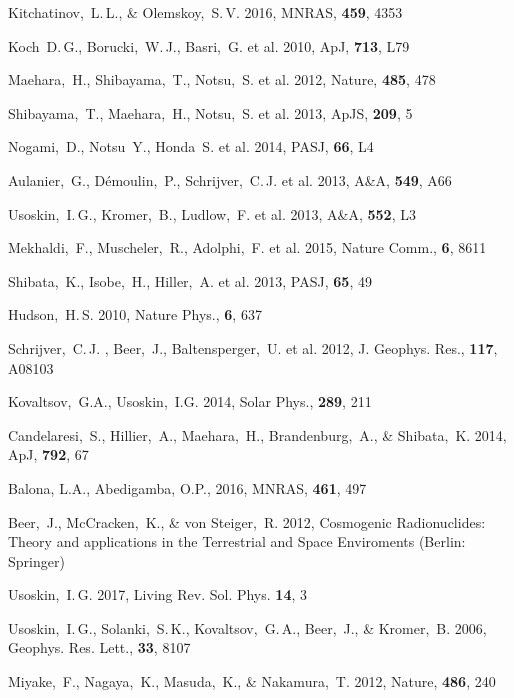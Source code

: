 \documentclass[fleqn,12pt]{SelfArx} %
\begin{document}

\begin{thebibliography}{99}

Kitchatinov,~L.\,L., \& Olemskoy,~S.\,V. 2016, MNRAS, \textbf{459}, 4353

Koch~D.\,G., Borucki,~W.\,J., Basri,~G. et al. 2010, ApJ, \textbf{713}, L79

Maehara,~H., Shibayama,~T., Notsu,~S. et al. 2012, Nature, \textbf{485}, 478

Shibayama,~T., Maehara,~H., Notsu,~S. et al. 2013, ApJS, \textbf{209}, 5

Nogami,~D., Notsu~Y., Honda~S. et al. 2014, PASJ, \textbf{66}, L4

Aulanier,~G., D\'emoulin,~P., Schrijver,~C.\,J. et al. 2013, A\&A, \textbf{549}, A66

Usoskin,~I.\,G., Kromer,~B., Ludlow,~F. et al. 2013, A\&A, \textbf{552}, L3

Mekhaldi,~F., Muscheler,~R., Adolphi,~F. et al. 2015, Nature Comm., \textbf{6}, 8611

Shibata,~K., Isobe,~H., Hiller,~A. et al. 2013, PASJ, \textbf{65}, 49

Hudson,~H.\,S. 2010, Nature Phys., \textbf{6}, 637

Schrijver,~C.\,J. , Beer,~J., Baltensperger,~U. et al. 2012, J. Geophys. Res., \textbf{117}, A08103

Kovaltsov,~G.A., Usoskin,~I.G. 2014, Solar Phys., \textbf{289}, 211

Candelaresi,~S., Hillier,~A., Maehara,~H., Brandenburg,~A., \& Shibata,~K. 2014, ApJ, \textbf{792}, 67

Balona, L.A., Abedigamba, O.P., 2016, MNRAS, \textbf{461}, 497

Beer,~J., McCracken,~K., \& von Steiger,~R. 2012, Cosmogenic Radionuclides: Theory and applications in the 
Terrestrial and Space Enviroments (Berlin: Springer)

Usoskin,~I.\,G. 2017, Living Rev. Sol. Phys. \textbf{14}, 3


Usoskin,~I.\,G., Solanki,~S.\,K., Kovaltsov,~G.\,A., Beer,~J., \& Kromer,~B. 2006, Geophys. Res. Lett., \textbf{33}, 8107


Miyake,~F., Nagaya,~K., Masuda,~K., \& Nakamura,~T. 2012, Nature, \textbf{486}, 240


\end{thebibliography}
\end{document}

